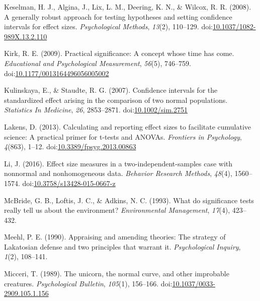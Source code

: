 \documentclass[
  man,floatsintext]{apa6}
\begin{document}
\leavevmode\hypertarget{ref-Keselman_et_al_2008}{}%
Keselman, H. J., Algina, J., Lix, L. M., Deering, K. N., \& Wilcox, R. R. (2008). A generally robust approach for testing hypotheses and setting confidence intervals for effect sizes. \emph{Psychological Methods}, \emph{13}(2), 110--129. doi:\href{https://doi.org/10.1037/1082-989X.13.2.110}{10.1037/1082-989X.13.2.110}

\leavevmode\hypertarget{ref-Kirk_2009}{}%
Kirk, R. E. (2009). Practical significance: A concept whose time has come. \emph{Educational and Psychological Measurement}, \emph{56}(5), 746--759. doi:\href{https://doi.org/10.1177/0013164496056005002\%20}{10.1177/0013164496056005002 }

\leavevmode\hypertarget{ref-Kulinskaya_Staudte_2007}{}%
Kulinskaya, E., \& Staudte, R. G. (2007). Confidence intervals for the standardized effect arising in the comparison of two normal populations. \emph{Statistics In Medicine}, \emph{26}, 2853--2871. doi:\href{https://doi.org/10.1002/sim.2751}{10.1002/sim.2751}

\leavevmode\hypertarget{ref-Lakens_2013}{}%
Lakens, D. (2013). Calculating and reporting effect sizes to facilitate cumulative science: A practical primer for t-tests and ANOVAs. \emph{Frontiers in Psychology}, \emph{4}(863), 1--12. doi:\href{https://doi.org/10.3389/fpsyg.2013.00863}{10.3389/fpsyg.2013.00863}

\leavevmode\hypertarget{ref-Li_2016}{}%
Li, J. (2016). Effect size measures in a two-independent-samples case with nonnormal and nonhomogeneous data. \emph{Behavior Research Methods}, \emph{48}(4), 1560--1574. doi:\href{https://doi.org/10.3758/s13428-015-0667-z}{10.3758/s13428-015-0667-z}

\leavevmode\hypertarget{ref-McBride_et_al_1993}{}%
McBride, G. B., Loftis, J. C., \& Adkins, N. C. (1993). What do significance tests really tell us about the environment? \emph{Environmental Management}, \emph{17}(4), 423--432.

\leavevmode\hypertarget{ref-Meehl_1990}{}%
Meehl, P. E. (1990). Appraising and amending theories: The strategy of Lakatosian defense and two principles that warrant it. \emph{Psychological Inquiry}, \emph{1}(2), 108--141.

\leavevmode\hypertarget{ref-Micceri_1989}{}%
Micceri, T. (1989). The unicorn, the normal curve, and other improbable creatures. \emph{Psychological Bulletin}, \emph{105}(1), 156--166. doi:\href{https://doi.org/10.1037/0033-2909.105.1.156}{10.1037/0033-2909.105.1.156}
\end{document}
